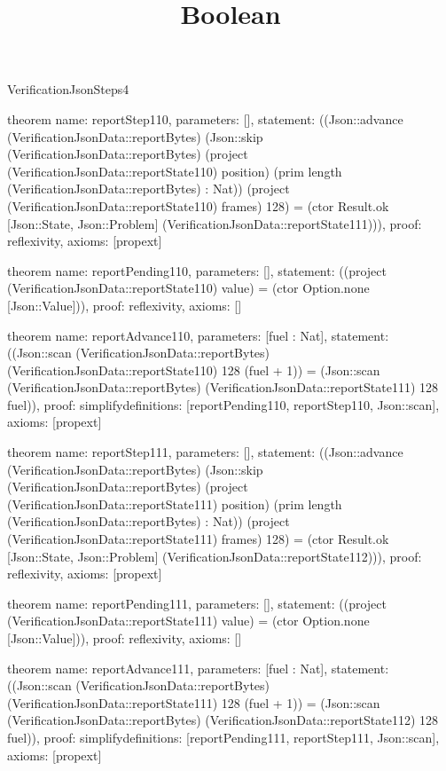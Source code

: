 \begin{lexlean}{VerificationJsonSteps4}
\title{Boolean}
\begin{semanticmodule}

theorem{
  name: reportStep110,
  parameters: [],
  statement: ((Json::advance (VerificationJsonData::reportBytes) (Json::skip (VerificationJsonData::reportBytes) (project (VerificationJsonData::reportState110) position) (prim length (VerificationJsonData::reportBytes) : Nat)) (project (VerificationJsonData::reportState110) frames) 128) = (ctor Result.ok [Json::State, Json::Problem] (VerificationJsonData::reportState111))),
  proof: reflexivity{},
  axioms: [propext]
}

theorem{
  name: reportPending110,
  parameters: [],
  statement: ((project (VerificationJsonData::reportState110) value) = (ctor Option.none [Json::Value])),
  proof: reflexivity{},
  axioms: []
}

theorem{
  name: reportAdvance110,
  parameters: [fuel : Nat],
  statement: ((Json::scan (VerificationJsonData::reportBytes) (VerificationJsonData::reportState110) 128 (fuel + 1)) = (Json::scan (VerificationJsonData::reportBytes) (VerificationJsonData::reportState111) 128 fuel)),
  proof: simplify{definitions: [reportPending110, reportStep110, Json::scan]},
  axioms: [propext]
}

theorem{
  name: reportStep111,
  parameters: [],
  statement: ((Json::advance (VerificationJsonData::reportBytes) (Json::skip (VerificationJsonData::reportBytes) (project (VerificationJsonData::reportState111) position) (prim length (VerificationJsonData::reportBytes) : Nat)) (project (VerificationJsonData::reportState111) frames) 128) = (ctor Result.ok [Json::State, Json::Problem] (VerificationJsonData::reportState112))),
  proof: reflexivity{},
  axioms: [propext]
}

theorem{
  name: reportPending111,
  parameters: [],
  statement: ((project (VerificationJsonData::reportState111) value) = (ctor Option.none [Json::Value])),
  proof: reflexivity{},
  axioms: []
}

theorem{
  name: reportAdvance111,
  parameters: [fuel : Nat],
  statement: ((Json::scan (VerificationJsonData::reportBytes) (VerificationJsonData::reportState111) 128 (fuel + 1)) = (Json::scan (VerificationJsonData::reportBytes) (VerificationJsonData::reportState112) 128 fuel)),
  proof: simplify{definitions: [reportPending111, reportStep111, Json::scan]},
  axioms: [propext]
}


\end{semanticmodule}
\end{lexlean}
